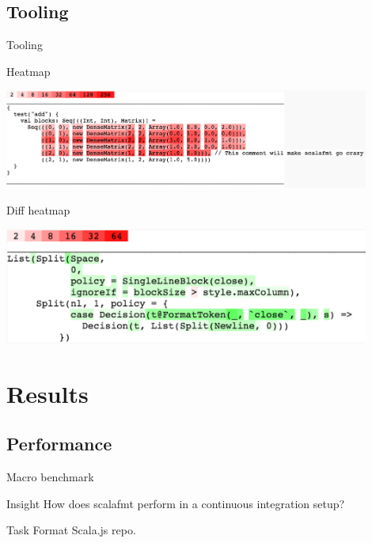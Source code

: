 \documentclass[xcolor=dvipsnames]{beamer}
\theoremstyle{definition}
\begin{document}
\subsection{Tooling} %

\begin{frame}{}
  \begin{center}
    \Huge Tooling
  \end{center}
\end{frame}

\begin{frame}{Heatmap}
  \begin{center}
    \includegraphics[width=0.9\textwidth]{img/heatmap.png}
  \end{center}
\end{frame}

\begin{frame}{Diff heatmap}
  \begin{center}
    \includegraphics[width=0.9\textwidth]{img/heatmap2.png}
  \end{center}
\end{frame}


\section{Results} %
\label{sec:Results}

\subsection{Performance}


\begin{frame}{Macro benchmark}
  \begin{block}{Insight}
    How does scalafmt perform in a continuous integration setup?
  \end{block}
  \begin{block}{Task}
    Format Scala.js repo.
  \end{block}
\end{frame}
\end{document}
